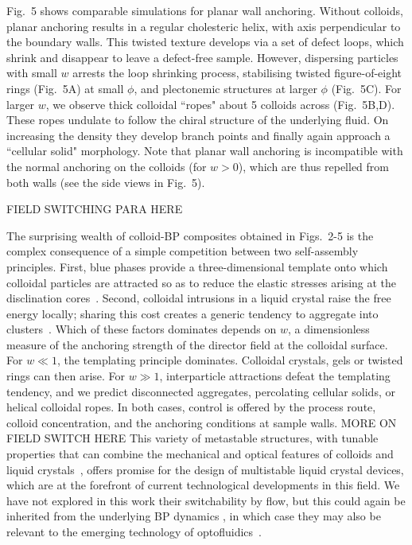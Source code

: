 \documentclass[12pt]{article}
\begin{document}
Fig.~5 shows comparable simulations for planar wall anchoring. 
Without colloids, planar anchoring results in a regular cholesteric helix,
with axis perpendicular to the boundary walls. 
This twisted texture develops via a set of defect loops,
which shrink and disappear to leave a defect-free sample. However,
dispersing particles with small $w$ arrests the loop shrinking process,
stabilising twisted figure-of-eight rings (Fig.~5A) at small $\phi$, and plectonemic structures at larger $\phi$ (Fig.~5C).
For larger $w$, we observe thick colloidal ``ropes" about 5 colloids across
(Fig.~5B,D). These ropes undulate to follow the chiral structure of the 
underlying fluid. On increasing the density they develop branch points and finally again approach a ``cellular solid" morphology. Note that planar wall anchoring is incompatible with the normal anchoring on the colloids (for $w>0$), which are thus repelled from both walls (see the side views in Fig.~5).

FIELD SWITCHING PARA HERE
\fi

The surprising wealth of colloid-BP composites obtained in Figs.~2-5 is the complex 
consequence of a simple competition between two self-assembly principles. 
First, blue phases provide a three-dimensional 
template onto which colloidal particles are attracted so as to reduce the elastic stresses arising at the disclination cores~\cite{miha}. Second, colloidal intrusions in a 
liquid crystal raise the free energy locally; sharing this cost creates a 
generic tendency to aggregate into clusters~\cite{tiffany}. Which of these factors dominates depends on $w$, a dimensionless measure of the anchoring strength of the director field at the colloidal surface. 
For $w\ll 1$, the templating principle dominates. Colloidal crystals, gels or twisted rings can then arise. For $w \gg 1$, interparticle attractions defeat the templating tendency, and we predict disconnected aggregates, percolating cellular solids, or helical colloidal ropes. In both cases, control is offered by the process route, colloid concentration, and the anchoring conditions at sample walls.
MORE ON FIELD SWITCH HERE
This variety of metastable structures, with tunable properties that can combine the mechanical and optical features of colloids and liquid crystals~\cite{lavrentovich}, offers promise for the design of multistable liquid
crystal devices, which are at the forefront of current technological 
developments in this field. We have not explored in this work their switchability by flow, but this could again be inherited from the underlying BP dynamics \cite{flowswitch}, in which case they may also be relevant to the emerging technology of optofluidics~\cite{optofluidics}.
\end{document}
